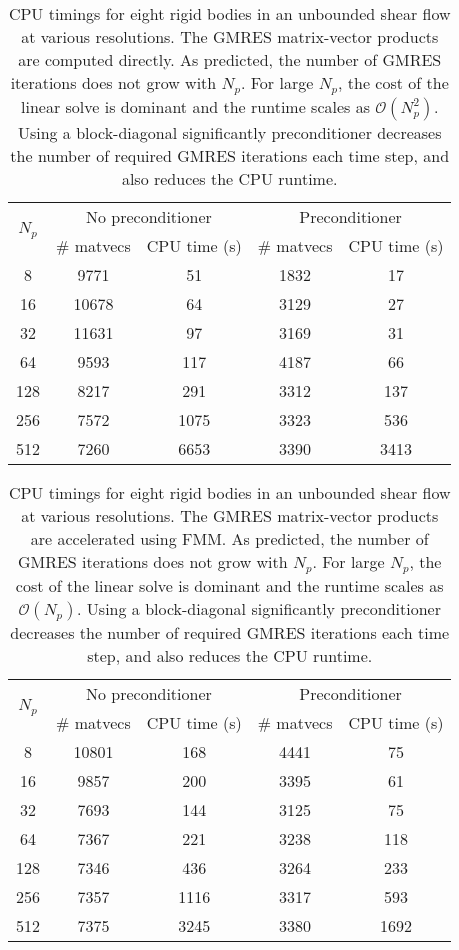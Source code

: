 \begin{table}[!h]\caption[Time comparison of multiple fibers in shear flow without using FMM]{CPU timings for eight rigid bodies in an unbounded shear flow at various resolutions. The GMRES matrix-vector products are computed directly. As predicted, the number of GMRES iterations does not grow with $N_p$. For large $N_p$, the cost of the linear solve is dominant and the runtime scales as  $\mathcal{O}(N_p^2)$. Using a block-diagonal significantly preconditioner decreases the number of required GMRES iterations each time step, and also reduces the CPU runtime.}\label{tab:shear_time_no_fmm}
\begin{center}
\begin{tabular}{c | c| c | c  | c}
	\multirow{2}{*}{$N_p$} &
	\multicolumn{2}{c}{No preconditioner} &
      	\multicolumn{2}{c}{Preconditioner}\\
      & \# matvecs & CPU time (s)  & \# matvecs & CPU time (s) \\
	\hline
	8 & 9771 & 51 & 1832 & 17 \\
	16 & 10678 & 64 &  3129 & 27\\
	32 &  11631& 97& 3169 & 31\\
	64 & 9593& 117 &  4187& 66\\
	128 & 8217 & 291&  3312& 137\\
	256 & 7572 & 1075 &  3323&536\\
	512 & 7260 & 6653 &  3390& 3413
\end{tabular}
\end{center}
\end{table}

\begin{table}[!h]\caption[Time comparison of multiple fibers in shear flow using FMM]{CPU timings for eight rigid bodies in an unbounded shear flow at various resolutions. The GMRES matrix-vector products are accelerated using FMM. As predicted, the number of GMRES iterations does not grow with $N_p$. For large $N_p$, the cost of the linear solve is dominant and the runtime scales as $\mathcal{O}(N_p)$. Using a block-diagonal significantly preconditioner decreases the number of required GMRES iterations each time step, and also reduces the CPU runtime.}\label{tab:shear_time_fmm}
\begin{center}
\begin{tabular}{c | c| c | c  | c}
	\multirow{2}{*}{$N_p$} &
	\multicolumn{2}{c}{No preconditioner} &
      	\multicolumn{2}{c}{Preconditioner}\\
      & \# matvecs & CPU time (s)  & \# matvecs & CPU time (s) \\
	\hline
	8 & 10801& 168 & 4441 & 75  \\
	16  & 9857 & 200 &  3395 & 61\\
	32 &  7693& 144& 3125 & 75\\
	64 & 7367&  221&  3238 & 118\\
	128 & 7346 & 436&  3264 & 233\\
	256 & 7357& 1116 &  3317 &593\\
	512 & 7375& 3245&  3380 & 1692
\end{tabular}
\end{center}
\end{table}


